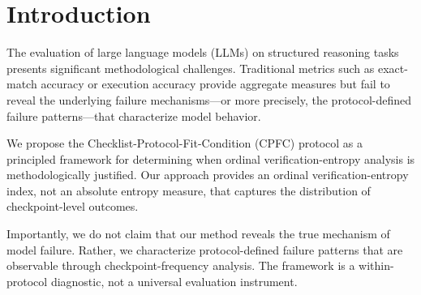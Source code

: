 \section{Introduction}\label{sec:intro}

The evaluation of large language models (LLMs) on structured reasoning tasks presents significant methodological challenges. Traditional metrics such as exact-match accuracy or execution accuracy provide aggregate measures but fail to reveal the underlying failure mechanisms---or more precisely, the protocol-defined failure patterns---that characterize model behavior.

We propose the Checklist-Protocol-Fit-Condition (CPFC) protocol as a principled framework for determining when ordinal verification-entropy analysis is methodologically justified. Our approach provides an ordinal verification-entropy index, not an absolute entropy measure, that captures the distribution of checkpoint-level outcomes.

Importantly, we do not claim that our method reveals the true mechanism of model failure. Rather, we characterize protocol-defined failure patterns that are observable through checkpoint-frequency analysis. The framework is a within-protocol diagnostic, not a universal evaluation instrument.
